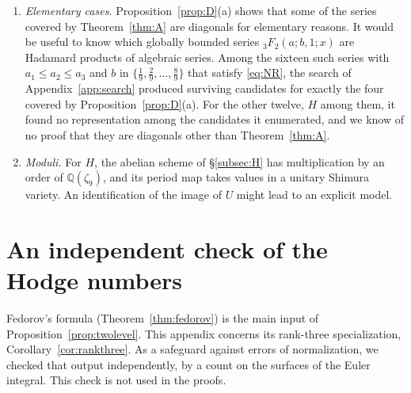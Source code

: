\documentclass[11pt]{amsart}
\theoremstyle{definition}
\theoremstyle{remark}
\numberwithin{equation}{section}
\newcommand{\Q}{\mathbb{Q}}
\begin{document}
\begin{enumerate}[label=(\arabic*),leftmargin=2em]
\item \emph{Elementary cases.} Proposition~\ref{prop:D}(a) shows that some of the series covered by Theorem~\ref{thm:A} are diagonals for elementary reasons. It would be useful to know which globally bounded series ${}_3F_2(a;b,1;x)$ are Hadamard products of algebraic series. Among the sixteen such series with $a_1\le a_2\le a_3$ and $b$ in $\{\frac19,\frac29,\dots,\frac89\}$ that satisfy \eqref{eq:NR}, the search of Appendix~\ref{app:search} produced surviving candidates for exactly the four covered by Proposition~\ref{prop:D}(a). For the other twelve, $H$ among them, it found no representation among the candidates it enumerated, and we know of no proof that they are diagonals other than Theorem~\ref{thm:A}.
\item \emph{Moduli.} For $H$, the abelian scheme of \S\ref{subsec:H} has multiplication by an order of $\Q(\zeta_9)$, and its period map takes values in a unitary Shimura variety. An identification of the image of $U$ might lead to an explicit model.
\end{enumerate}

\appendix
\section{An independent check of the Hodge numbers}\label{app:euler}

Fedorov's formula (Theorem~\ref{thm:fedorov}) is the main input of Proposition~\ref{prop:twolevel}. This appendix concerns its rank-three specialization, Corollary~\ref{cor:rankthree}. As a safeguard against errors of normalization, we checked that output independently, by a count on the surfaces of the Euler integral. This check is not used in the proofs.
\end{document}
